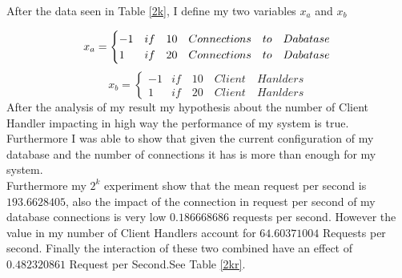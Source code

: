 After the data seen in Table \ref{2k}, I define my two variables $x_{a}$ and $x_{b}$



\begin{table}\centering
         \caption{}
         \label{2k}
 \end{table}  
 
 $$x_{a}=\begin{cases} -1& if\quad 10 \quad Connections\quad  to\quad  Dabatase\\1 & if\quad 20 \quad Connections\quad  to\quad  Dabatase\end{cases}\\
 $$
 $$x_{b}=\begin{cases} -1& if\quad 10 \quad Client\quad Hanlders\\1 & if\quad 20 \quad Client\quad Hanlders\end{cases}$$
 After the analysis of my result my hypothesis about the number of Client Handler impacting in high way the performance of my system is true. Furthermore I was able to show that given the current configuration of my database and the number of connections it has is more than enough for my system.\\
 
Furthermore my $2^k$ experiment show that the mean request per second is $193.6628405$, also the impact of the connection in request per second of my database connections is very low $ 0.186668686$ requests per second. However the value in my number of Client Handlers account for $ 64.60371004$ Requests per second. Finally the interaction of these two combined have an effect of $ 0.482320861$ Request per Second.See Table \ref{2kr}.


